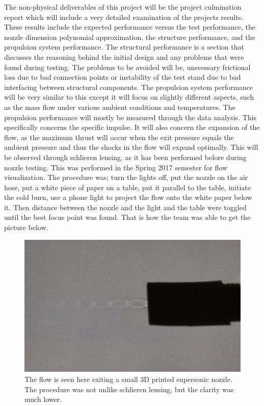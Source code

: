 \documentclass[conference]{IEEEtran} %
\begin{document}
The non-physical deliverables of this project will be the project culmination report which will include a very detailed examination of the projects
results. These results include the expected performance versus the test performance, the nozzle dimension polynomial approximation, the structure performance, and the
propulsion system performance. The structural performance is a section that discusses the reasoning behind the initial design and any problems
that were found during testing. The problems to be avoided will be, unecessary frictional loss due to bad connection points or instability of the test stand due to
bad interfacing between structural components. The propulsion system performance will be very similar to this except it will focus on slightly different aspects, such as
the mass flow under various ambient conditions and temperatures. The propulsion performance will mostly be measured through the data analysis. This specifically concerns the
specific impulse. It will also concern the expansion of the flow, as the maximum thrust will occur when the exit pressure equals the ambient pressure and thus the shocks
in the flow will expand optimally. This will be observed through schlieren lensing, as it has been performed before during nozzle testing. This was performed in the Spring 2017
semester for flow visualization. The procedure was; turn the lights off, put the nozzle on the air hose, put a white piece of paper on a table, put it parallel to the table, initiate the cold burn, use a phone light
to project the flow onto the white paper below it. Then distance between the nozzle and the light and the table were toggled until the best focus point was found. That is how the team
was able to get the picture below.

\begin{figure}[h]
  \includegraphics[width=\linewidth]{figs/nozzle-shocks[2].png}
  \caption{The flow is seen here exiting a small 3D printed supersonic nozzle. The procedure was not unlike schlieren lensing, but the clarity was much lower.}
  \label{fig: nozzle shocks}
\end{figure}
\end{document}
